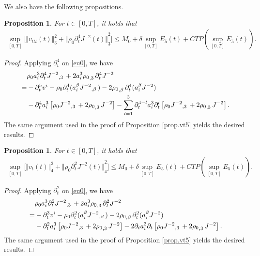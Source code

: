 \documentclass[12pt,twoside,reqno]{amsart}
\numberwithin{equation}{section}
\newtheorem{proposition}[theorem]{Proposition}
\theoremstyle{definition}
\theoremstyle{remark}
\begin{document}
We also have the following propositions.

\begin{proposition}
  For $t\in [0,T]$, it holds that
  \begin{align*}
    \sup_{[0,T]}\Big[{\Vert{ v_{ttt}(t)}\Vert}_3^2+{\Vert{{\rho_0}  {\partial}_t^4J^{-2}(t)}\Vert}_3^2\Big]{\leqslant}  M_0+\delta \sup_{[0,T]} E_5(t)+CTP(\sup_{[0,T]}E_5(t)).
  \end{align*}
\end{proposition}

\begin{proof}
  Applying ${\partial}_t^4$ on \eqref{eu0}, we have
  \begin{align}\label{eq.vt1}
    &{\rho_0}  a_i^3 {\partial}_t^4{{{J^{-2}}}_{,{3}}\,}+2 a_i^3{{\rho_0}_{,{3}}\,} {\partial}_t^4 J^{-2}{\nonumber}\\
    =&-{\partial}_t^5v^i-{\rho_0}  {\partial}_t^4(a_i^\beta{{{J^{-2}}}_{,{\beta}}\,})-2 {{\rho_0}_{,{\beta}}\,} {\partial}_t^4(a_i^\beta J^{-2}){\nonumber}\\
    &-{\partial}_t^4 a_i^3\left[ {\rho_0}  {{{J^{-2}}}_{,{3}}\,}+2 {{\rho_0}_{,{3}}\,}J^{-2}\right]-\sum_{l=1}^3{\partial}_t^{4-l} a_i^3{\partial}_t^l\left[ {\rho_0}  {{{J^{-2}}}_{,{3}}\,}+2 {{\rho_0}_{,{3}}\,}J^{-2}\right].
\end{align}
The same argument used in the proof of Proposition \ref{prop.vt5} yields the desired results.
\end{proof}

\begin{proposition}
  For $t\in [0,T]$, it holds that
  \begin{align*}
    \sup_{[0,T]}\Big[{\Vert{ v_{t}(t)}\Vert}_4^2+{\Vert{{\rho_0}  {\partial}_t^2J^{-2}(t)}\Vert}_4^2\Big]{\leqslant}  M_0+\delta \sup_{[0,T]} E_5(t)+CTP(\sup_{[0,T]}E_5(t)).
  \end{align*}
\end{proposition}

\begin{proof}
  Applying ${\partial}_t^2$ on \eqref{eu0}, we have
  \begin{align}\label{eq.vt11}
    &{\rho_0}  a_i^3 {\partial}_t^2{{{J^{-2}}}_{,{3}}\,}+2 a_i^3{{\rho_0}_{,{3}}\,} {\partial}_t^2 J^{-2}{\nonumber}\\
    =&-{\partial}_t^3v^i-{\rho_0}  {\partial}_t^2(a_i^\beta{{{J^{-2}}}_{,{\beta}}\,})-2 {{\rho_0}_{,{\beta}}\,} {\partial}_t^2(a_i^\beta J^{-2}){\nonumber}\\
    &-{\partial}_t^2 a_i^3\left[ {\rho_0}  {{{J^{-2}}}_{,{3}}\,}+2 {{\rho_0}_{,{3}}\,}J^{-2}\right]-2{\partial}_t a_i^3{\partial}_t\left[ {\rho_0}  {{{J^{-2}}}_{,{3}}\,}+2 {{\rho_0}_{,{3}}\,}J^{-2}\right].
\end{align}
The same argument used in the proof of Proposition \ref{prop.vt5} yields the desired results.
\end{proof}
\end{document}
